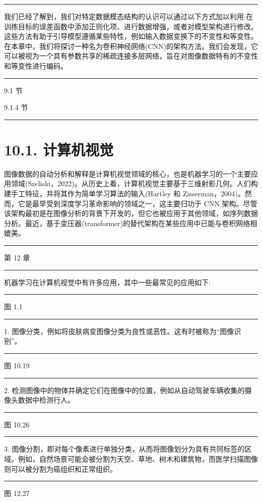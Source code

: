 \documentclass[10pt]{report}
\newcommand{\HRule}{\begin{center}\rule{0.9\linewidth}{0.2mm}\end{center}}
\begin{document}
\HRule

我们已经了解到，我们对特定数据模态结构的认识可以通过以下方式加以利用:在训练目标的误差函数中添加正则化项、进行数据增强，或者对模型架构进行修改。这些方法有助于引导模型遵循某些特性，例如输入数据变换下的不变性和等变性。在本章中，我们将探讨一种名为卷积神经网络(CNN)的架构方法。我们会发现，它可以被视为一个具有参数共享的稀疏连接多层网络，旨在对图像数据特有的不变性和等变性进行编码。

\HRule

9.1 节

9.1.4 节

\HRule

\section*{10.1. 计算机视觉}

图像数据的自动分析和解释是计算机视觉领域的核心，也是机器学习的一个主要应用领域(Szeliski，2022)。从历史上看，计算机视觉主要基于三维射影几何。人们构建手工特征，并将其作为简单学习算法的输入(Hartley 和 Zisserman，2004)。然而，它是最早受到深度学习革命影响的领域之一，这主要归功于 CNN 架构。尽管该架构最初是在图像分析的背景下开发的，但它也被应用于其他领域，如序列数据分析。最近，基于变压器(transformer)的替代架构在某些应用中已能与卷积网络相媲美。

\HRule

第 12 章

\HRule

机器学习在计算机视觉中有许多应用，其中一些最常见的应用如下:

\HRule

图 1.1

\HRule

1. 图像分类，例如将皮肤病变图像分类为良性或恶性。这有时被称为“图像识别”。

\HRule

图 10.19

\HRule

2. 检测图像中的物体并确定它们在图像中的位置，例如从自动驾驶车辆收集的摄像头数据中检测行人。

\HRule

图 10.26

\HRule

3. 图像分割，即对每个像素进行单独分类，从而将图像划分为具有共同标签的区域。例如，自然场景可能会被分割为天空、草地、树木和建筑物，而医学扫描图像则可以被分割为癌组织和正常组织。

\HRule

图 12.27
\end{document}
